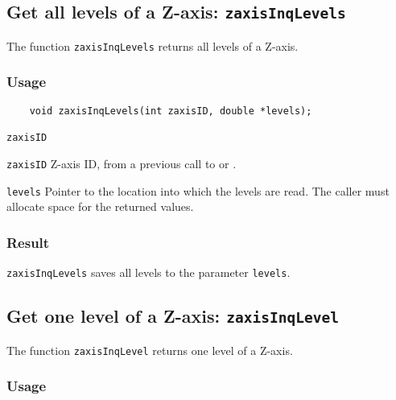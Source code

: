 \subsection{Get all levels of a Z-axis: \texttt{zaxisInqLevels}}
\label{zaxisInqLevels}

The function {\texttt{zaxisInqLevels}} returns all levels of a Z-axis.

\subsubsection*{Usage}

\begin{verbatim}
    void zaxisInqLevels(int zaxisID, double *levels);
\end{verbatim}

\hspace*{4mm}\begin{minipage}[]{15cm}
\begin{deflist}{\texttt{zaxisID}\ }
\item[\texttt{zaxisID}]
Z-axis ID, from a previous call to {} or {}.
\item[\texttt{levels}]
Pointer to the location into which the levels are read.
                    The caller must allocate space for the returned values.

\end{deflist}
\end{minipage}

\subsubsection*{Result}

{\texttt{zaxisInqLevels}} saves all levels to the parameter {\texttt{levels}}.


\subsection{Get one level of a Z-axis: \texttt{zaxisInqLevel}}
\label{zaxisInqLevel}

The function {\texttt{zaxisInqLevel}} returns one level of a Z-axis.

\subsubsection*{Usage}

